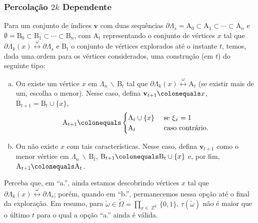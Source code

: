 \documentclass[9pt]{beamer}
\theoremstyle{definition} %
\DeclareMathOperator{\ZX}{\mathbb{Z}} %
\begin{document}
	\begin{frame}[t]
	\frametitle{Percolação $2k$ Dependente}
		Para um conjunto de índices $\mathbf{v}$ com duas sequências $\partial\Lambda_s = \text{A}_0 \subset \text{A}_1 \subset \cdots \subset \text{A}_n$ e $\emptyset = \text{B}_0 \subset \text{B}_1 \subset \cdots \subset \text{B}_n$, com $\text{A}_t$ representando o conjunto de vértices $x$ tal que $\partial\Lambda_k(x) \overset{\omega}{\leftrightarrow} \partial\Lambda_s$ e $\text{B}_t$ o conjunto de vértices explorados até o instante $t$, temos, dada uma ordem para os vértices considerados, uma construção (em $t$) do seguinte tipo:
		\begin{enumerate}[a.]
			\item Ou existe um vértice $x$ em $\Lambda_n \,\backslash\, \text{B}_t$ tal que $\partial\Lambda_k(x) \overset{\omega}{\leftrightarrow} \text{A}_t$ (se existir mais de um, escolha o menor). Nesse caso, defina $\mathbf{v}_{t + 1} \colonequals x$, $\text{B}_{t + 1} = \text{B}_t \cup \{x\}$,
			\[\text{A}_{t + 1} \colonequals
			\begin{cases}
			\text{A}_t \cup \{x\} & \text{ se } \xi_x = 1 \\
			\text{A}_t & \text{ caso contrário}.
			\end{cases}
			\]
			\item Ou não existe $x$ com tais características. Nesse caso, defina $\mathbf{v}_{t + 1}$ como o menor vértice em $\Lambda_n \,\backslash\, \text{B}_t$, $\text{B}_{t + 1} \colonequals \text{B}_t \cup \{x\}$ e, por fim, $\text{A}_{t + 1} \colonequals \text{A}_t$.
		\end{enumerate}
	
		Perceba que, em ``a.'', ainda estamos descobrindo vértices $x$ tal que $\partial\Lambda_k(x) \overset{\omega}{\leftrightarrow} \partial\Lambda_s$; porém, quando em ``b.'', permanecemos nessa opção até o final da exploração. Em resumo, para $\tilde{\omega} \in \tilde{\Omega} = \prod_{x \in \ZX^d} \{0, 1\}$, $\tau(\tilde{\omega})$ não é maior que o último $t$ para o qual a opção ``a.'' ainda é válida. 
	\end{frame}
\end{document}
